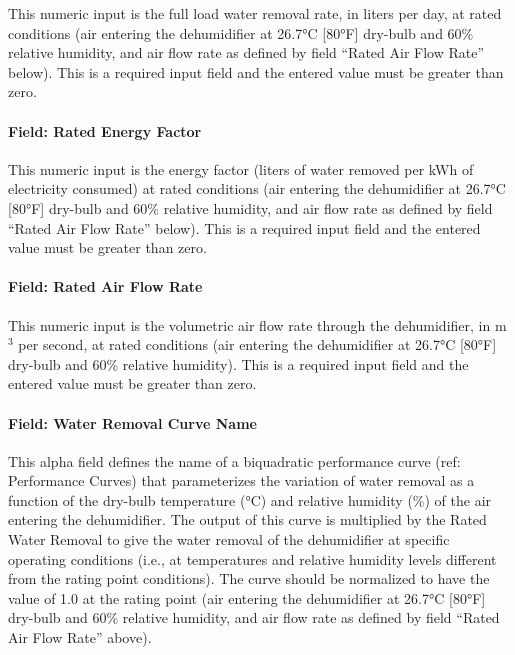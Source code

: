 This numeric input is the full load water removal rate, in liters per day, at rated conditions (air entering the dehumidifier at 26.7°\si{C} {[}80°F{]} dry-bulb and 60\% relative humidity, and air flow rate as defined by field ``Rated Air Flow Rate'' below). This is a required input field and the entered value must be greater than zero.

\paragraph{Field: Rated Energy Factor}\label{field-rated-energy-factor}

This numeric input is the energy factor (liters of water removed per kWh of electricity consumed) at rated conditions (air entering the dehumidifier at 26.7°\si{C} {[}80°F{]} dry-bulb and 60\% relative humidity, and air flow rate as defined by field ``Rated Air Flow Rate'' below). This is a required input field and the entered value must be greater than zero.

\paragraph{Field: Rated Air Flow Rate}\label{field-rated-air-flow-rate-001}

This numeric input is the volumetric air flow rate through the dehumidifier, in m\(^{3}\) per second, at rated conditions (air entering the dehumidifier at 26.7°\si{C} {[}80°F{]} dry-bulb and 60\% relative humidity). This is a required input field and the entered value must be greater than zero.

\paragraph{Field: Water Removal Curve Name}\label{field-water-removal-curve-name}

This alpha field defines the name of a biquadratic performance curve (ref: Performance Curves) that parameterizes the variation of water removal as a function of the dry-bulb temperature (°\si{C}) and relative humidity (\%) of the air entering the dehumidifier. The output of this curve is multiplied by the Rated Water Removal to give the water removal of the dehumidifier at specific operating conditions (i.e., at temperatures and relative humidity levels different from the rating point conditions). The curve should be normalized to have the value of 1.0 at the rating point (air entering the dehumidifier at 26.7°C {[}80°F{]} dry-bulb and 60\% relative humidity, and air flow rate as defined by field ``Rated Air Flow Rate'' above).

